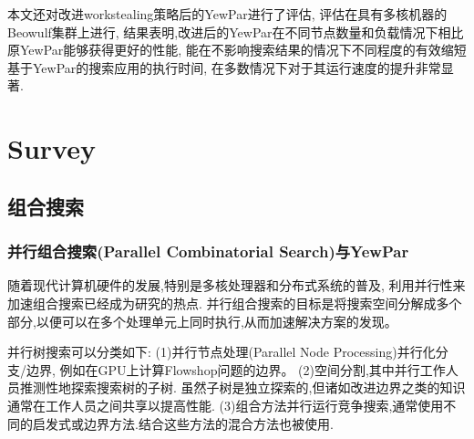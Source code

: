 \documentclass{mproj}
\begin{document}
本文还对改进workstealing策略后的YewPar进行了评估,
评估在具有多核机器的Beowulf集群上进行,
结果表明,改进后的YewPar在不同节点数量和负载情况下相比原YewPar能够获得更好的性能,
能在不影响搜索结果的情况下不同程度的有效缩短基于YewPar的搜索应用的执行时间,
在多数情况下对于其运行速度的提升非常显著.


\chapter{Survey}\label{survey}

\section{组合搜索}

\subsection{并行组合搜索(Parallel Combinatorial Search)与YewPar}
随着现代计算机硬件的发展,特别是多核处理器和分布式系统的普及,
利用并行性来加速组合搜索已经成为研究的热点.
并行组合搜索的目标是将搜索空间分解成多个部分,以便可以在多个处理单元上同时执行,从而加速解决方案的发现。


并行树搜索可以分类\cite{gendron1994parallel}如下:
(1)并行节点处理(Parallel Node Processing)并行化分支/边界,
例如在GPU上计算Flowshop问题的边界\cite{gmys2016work}。
(2)空间分割,其中并行工作人员推测性地探索搜索树的子树.
虽然子树是独立探索的,但诸如改进边界之类的知识通常在工作人员之间共享以提高性能.
(3)组合方法并行运行竞争搜索,通常使用不同的启发式或边界方法.结合这些方法的混合方法也被使用.
\end{document}
